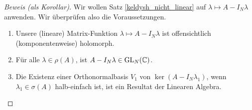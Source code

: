 \begin{proof}[Beweis (als Korollar)]

    Wir wollen Satz \ref{keldysh_nicht_linear} auf $\lambda \mapsto A - I_N \lambda$ anwenden.
    Wir überprüfen also die Voraussetzungen.

    \begin{enumerate}[label = \arabic*.]

        \item Unsere (lineare) Matrix-Funktion $\lambda \mapsto A - I_N \lambda$ ist offensichtlich (komponentenweise) holomorph.

        \item Für alle $\lambda \in \rho(A)$, ist $A - I_N \lambda \in \operatorname{GL}_N(\mathbb{C})$.

        \item Die Existenz einer Orthonormalbasis $V_1$ von $\ker (A - I_N \lambda_1)$, wenn $\lambda_1 \in \sigma(A)$ halb-einfach ist, ist ein Resultat der Linearen Algebra.
        
        \begin{comment}

            Seien $\lambda_2, \dots, \lambda_k$ die restlichen (paarweise verschiedenen) Eigenwerte von $A$.
            Seien $L_n^\mathrm{geo}$ und $L_n^\mathrm{alg}$ die geometrische bzw. algebraische Vielfachheit von $\lambda_n$ für $n = 2, \dots, k$.
            Betrachte die Jordan Normalform von $A$.
        

\end{comment}
\end{enumerate}
\end{proof}
